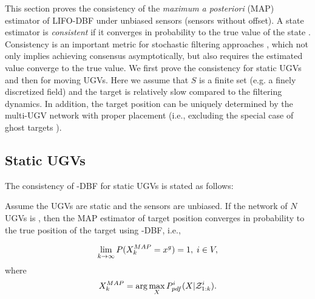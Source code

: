 	
	This section proves the consistency of the \textit{maximum a posteriori} (MAP) estimator of LIFO-DBF under unbiased sensors (sensors without offset).
	A state estimator is \textit{consistent} if it converges in probability to the true value of the state \cite{amemiya1985advanced}.
	Consistency is an important metric for stochastic filtering approaches \cite{chen2003bayesian}, which 
	not only implies achieving consensus asymptotically, but also requires the estimated value converge to the true value.	
	We first prove the consistency for static UGVs and then for moving UGVs. 
	Here we assume that $S$ is a finite set (e.g. a finely discretized field) and the target is relatively slow compared to the filtering dynamics.
	In addition, the target position can be uniquely determined by the multi-UGV network with proper placement (i.e., excluding the special case of ghost targets \cite{malanowski2012two}).
	
	\subsection{Static UGVs}	
	The consistency of \proto-DBF for static UGVs is stated as follows: 
	
	\begin{thm}\label{thm:\proto-dbf-sta-ugv}
		Assume the UGVs are static and the sensors are unbiased. If the network of $N$ UGVs is \fc, then the MAP estimator of target position converges in probability to the true position of the target using \proto-DBF, i.e.,
		
		\small\begin{equation*}
		\lim\limits_{k\rightarrow \infty}
		P(X_k^{MAP}=x^g)=
		1,\;i\in V,
		\end{equation*}\normalsize
		where 
		\small\begin{equation*}
		X_k^{MAP}=\arg\max\limits_{X}P^i_{pdf}(X|\mathcal{Z}^{i}_{1:k}).
		\end{equation*}		
	\end{thm}
	
